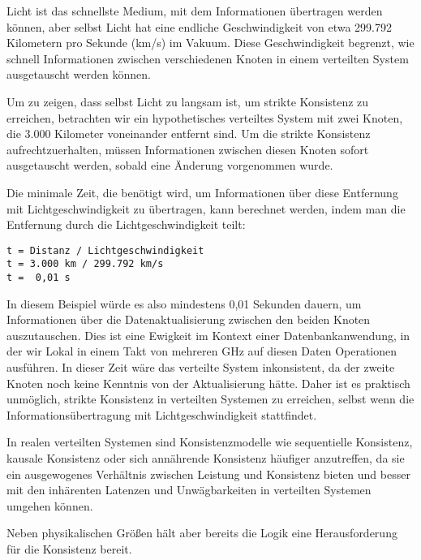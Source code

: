 \documentclass[../vs-script-first-v01.tex]{subfiles}
\begin{document}
Licht ist das schnellste Medium, mit dem Informationen übertragen werden können, aber selbst Licht hat eine endliche Geschwindigkeit von etwa 299.792 Kilometern pro Sekunde (km/s) im Vakuum. Diese Geschwindigkeit begrenzt, wie schnell Informationen zwischen verschiedenen Knoten in einem verteilten System ausgetauscht werden können.

Um zu zeigen, dass selbst Licht zu langsam ist, um strikte Konsistenz zu erreichen, betrachten wir ein hypothetisches verteiltes System mit zwei Knoten, die 3.000 Kilometer voneinander entfernt sind. Um die strikte Konsistenz aufrechtzuerhalten, müssen Informationen zwischen diesen Knoten sofort ausgetauscht werden, sobald eine Änderung vorgenommen wurde.

Die minimale Zeit, die benötigt wird, um Informationen über diese Entfernung mit Lichtgeschwindigkeit zu übertragen, kann berechnet werden, indem man die Entfernung durch die Lichtgeschwindigkeit teilt:
\begin{lstlisting}[caption={Berechnung Lichtgeschwindigkeit},captionpos=b,label={lst:licht}]
t = Distanz / Lichtgeschwindigkeit
t = 3.000 km / 299.792 km/s
t =  0,01 s
\end{lstlisting}
In diesem Beispiel würde es also mindestens 0,01 Sekunden dauern, um Informationen über die Datenaktualisierung zwischen den beiden Knoten auszutauschen. Dies ist eine Ewigkeit im Kontext einer Datenbankanwendung, in der wir Lokal in einem Takt von mehreren GHz auf diesen Daten Operationen ausführen. In dieser Zeit wäre das verteilte System inkonsistent, da der zweite Knoten noch keine Kenntnis von der Aktualisierung hätte. Daher ist es praktisch unmöglich, strikte Konsistenz in verteilten Systemen zu erreichen, selbst wenn die Informationsübertragung mit Lichtgeschwindigkeit stattfindet.

In realen verteilten Systemen sind Konsistenzmodelle wie sequentielle Konsistenz, kausale Konsistenz oder sich annährende Konsistenz häufiger anzutreffen, da sie ein ausgewogenes Verhältnis zwischen Leistung und Konsistenz bieten und besser mit den inhärenten Latenzen und Unwägbarkeiten in verteilten Systemen umgehen können.

Neben physikalischen Größen hält aber bereits die Logik eine Herausforderung für die Konsistenz  bereit. 
\end{document}
